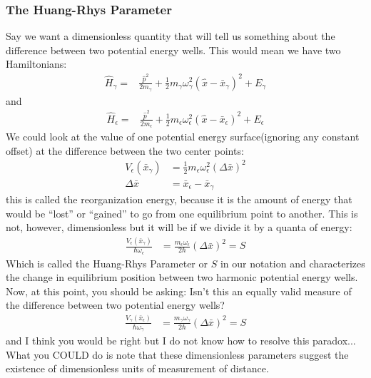 \subsubsection{The Huang-Rhys Parameter}
Say we want a dimensionless quantity that will tell us something about the difference between two potential energy wells.  This would mean we have two Hamiltonians:
\begin{align*}
	\hat{H}_{\gamma} =& \frac{\hat{p}^2}{2 m_{\gamma}} + \frac{1}{2} m_{\gamma} \omega_{\gamma}^2 \left(  \hat{x} - \bar{x}_{\gamma} \right)^2 + E_{\gamma}
\end{align*}
and
\begin{align*}
	\hat{H}_{\epsilon} =& \frac{\hat{p}^2}{2 m_{\epsilon}} + \frac{1}{2} m_{\epsilon} \omega_{\epsilon}^2 \left(  \hat{x} - \bar{x}_{\epsilon} \right)^2 + E_{\epsilon}
\end{align*}
We could look at the value of one potential energy surface(ignoring any constant offset)  at the difference between the two center points:
\begin{align*}
	V_{\epsilon} (\bar{x}_{\gamma} ) &= \frac{1}{2} m_{\epsilon} \omega_{\epsilon}^2 \left(  \Delta \bar{x} \right)^2 \\
	\Delta \bar{x} &= \bar{x}_{\epsilon} - \bar{x}_{\gamma}
\end{align*}
this is called the reorganization energy, because it is the amount of energy that would be ``lost'' or ``gained'' to go from one equilibrium point to another.  This is not, however, dimensionless but it will be if we divide it by a quanta of energy:
\begin{align*}
	\frac{V_{\epsilon} (\bar{x}_{\gamma} ) }{\hbar \omega_{\epsilon}} &= \frac{m_{\epsilon }\omega_{\epsilon}}{2 \hbar} \left(  \Delta \bar{x} \right)^2 = S
\end{align*}
Which is called the Huang-Rhys Parameter or $S$ in our notation and characterizes the change in equilibrium position between two harmonic potential energy wells.  Now, at this point, you should be asking:  Isn't this an equally valid measure of the difference between two potential energy wells?
\begin{align*}
	\frac{V_{\gamma} (\bar{x}_{\epsilon} ) }{\hbar \omega_{\gamma}} &= \frac{m_{\gamma }\omega_{\gamma}}{2 \hbar} \left(  \Delta \bar{x} \right)^2 = S
\end{align*}
and I think you would be right but I do not know how to resolve this paradox...  What you COULD do is note that these dimensionless parameters suggest the existence of dimensionless  units of measurement of distance.
